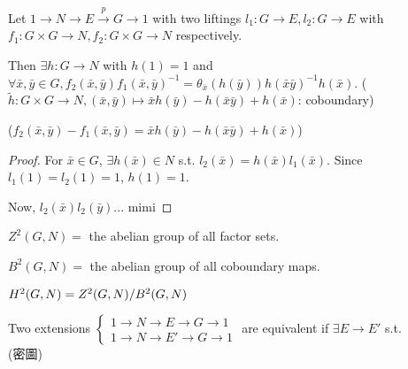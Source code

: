 \begin{prop}
  Let $1\to N\to E \xrightarrow{p}G \to 1$ with two liftings
  $l_1: G \to E, l_2: G\to E$ with $f_1: G\times G\to N, f_2: G\times G\to N$
  respectively.

  Then $\exists h: G\to N$ with $h(1) = 1$ and $\forall \bar{x},\bar{y}\in G,
  f_2(\bar{x}, \bar{y})f_1(\bar{x},\bar{y})^{-1}
  = \theta_{\bar{x}}(h(\bar{y}))h(\bar{x}\bar{y})^{-1}h(\bar{x})$.
  ($\tilde{h}: G\times G \to N, (\bar{x},\bar{y}) \mapsto
  \bar{x}h(\bar{y}) - h(\bar{x}\bar{y}) + h(\bar{x})$: coboundary)

  ($f_2(\bar{x},\bar{y}) - f_1(\bar{x},\bar{y}) = \bar{x}h(\bar{y}) - h(\bar{x}\bar{y}) + h(\bar{x})$)

  \begin{proof}
    For $\bar{x}\in G$, $\exists h(\bar{x}) \in N$ s.t.
    $l_2(\bar{x}) = h(\bar{x})l_1(\bar{x})$.
    Since $l_1(1) = l_2(1) = 1$, $h(1) = 1$.

    Now, $l_2(\bar{x})l_2(\bar{y})$... mimi
  \end{proof}
\end{prop}

\begin{definition}
  $Z^2(G, N) =$ the abelian group of all factor sets.
  
  $B^2(G, N) =$ the abelian group of all coboundary maps.

  $H^2(G, N) = {Z^2(G, N)}/{B^2(G, N)}$
\end{definition}

\begin{definition}
  Two extensions $\begin{cases}
    1\to N\to E\to G\to 1 \\
    1\to N\to E'\to G\to 1
  \end{cases}$
  are equivalent if $\exists E \to E'$ s.t.
  \[
  \]
  (密圖)
\end{definition}

